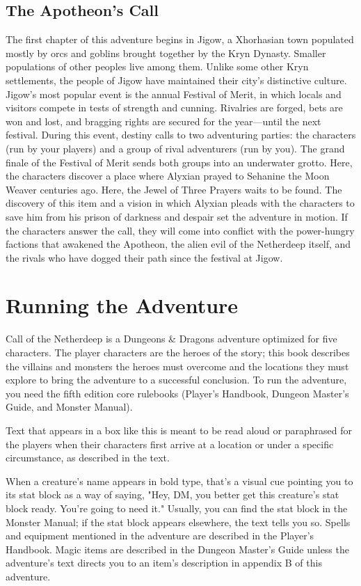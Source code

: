 \documentclass[10pt,a4paper,twoside,bg=print,twocolumn,openany,nodeprecatedcode]{dndbook}
\begin{document}
\subsection{The Apotheon's Call}
The first chapter of this adventure begins in Jigow, a Xhorhasian town populated mostly by orcs and goblins brought together by the Kryn Dynasty. Smaller populations of other peoples live among them. Unlike some other Kryn settlements, the people of Jigow have maintained their city's distinctive culture. Jigow's most popular event is the annual Festival of Merit, in which locals and visitors compete in tests of strength and cunning. Rivalries are forged, bets are won and lost, and bragging rights are secured for the year—until the next festival.
During this event, destiny calls to two adventuring parties: the characters (run by your players) and a group of rival adventurers (run by you). The grand finale of the Festival of Merit sends both groups into an underwater grotto. Here, the characters discover a place where Alyxian prayed to Sehanine the Moon Weaver centuries ago. Here, the Jewel of Three Prayers waits to be found. The discovery of this item and a vision in which Alyxian pleads with the characters to save him from his prison of darkness and despair set the adventure in motion. If the characters answer the call, they will come into conflict with the power-hungry factions that awakened the Apotheon, the alien evil of the Netherdeep itself, and the rivals who have dogged their path since the festival at Jigow.
\section{Running the Adventure}
Call of the Netherdeep is a Dungeons \& Dragons adventure optimized for five characters. The player characters are the heroes of the story; this book describes the villains and monsters the heroes must overcome and the locations they must explore to bring the adventure to a successful conclusion.
To run the adventure, you need the fifth edition core rulebooks (Player's Handbook, Dungeon Master's Guide, and Monster Manual).
\begin{DndReadAloud}{}
Text that appears in a box like this is meant to be read aloud or paraphrased for the players when their characters first arrive at a location or under a specific circumstance, as described in the text.
\end{DndReadAloud}

When a creature's name appears in bold type, that's a visual cue pointing you to its stat block as a way of saying, "Hey, DM, you better get this creature's stat block ready. You're going to need it." Usually, you can find the stat block in the Monster Manual; if the stat block appears elsewhere, the text tells you so.
Spells and equipment mentioned in the adventure are described in the Player's Handbook. Magic items are described in the Dungeon Master's Guide unless the adventure's text directs you to an item's description in appendix B of this adventure.
\end{document}
